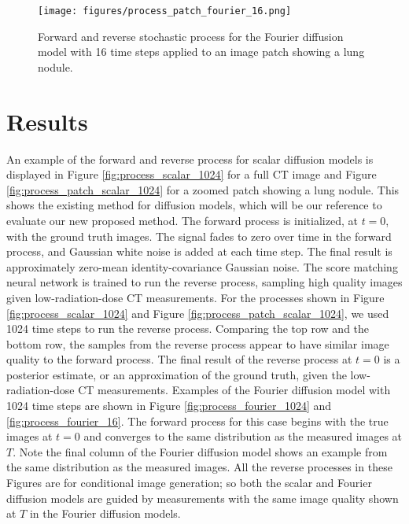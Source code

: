\documentclass[12pt,]{article}
\begin{document}
\begin{figure}[ht!]
    \centering
\texttt{[image: figures/process\_patch\_fourier\_16.png]}
    \caption{Forward and reverse stochastic process for the Fourier diffusion model with 16 time steps applied to an image patch showing a lung nodule. }
    \label{fig:process_patch_fourier_16}
\end{figure}

\vspace{-4mm}

\section{Results}

An example of the forward and reverse process for scalar diffusion models is displayed in Figure \ref{fig:process_scalar_1024} for a full CT image and Figure \ref{fig:process_patch_scalar_1024}  for a zoomed patch showing a lung nodule. This shows the existing method for diffusion models, which will be our reference to evaluate our new proposed method. The forward process is initialized, at $t=0$, with the ground truth images. The signal fades to zero over time in the forward process, and Gaussian white noise is added at each time step. The final result is approximately zero-mean identity-covariance Gaussian noise. The score matching neural network is trained to run the reverse process, sampling high quality images given low-radiation-dose  CT measurements. For the processes shown in Figure  \ref{fig:process_scalar_1024} and Figure \ref{fig:process_patch_scalar_1024}, we used 1024 time steps to run the reverse process. Comparing the top row and the bottom row, the samples from the reverse process appear to have similar image quality to the forward process. The final result of the reverse process at $t=0$ is a posterior estimate, or an approximation of the ground truth, given the low-radiation-dose CT measurements. Examples of the Fourier diffusion model with 1024 time steps are shown in Figure \ref{fig:process_fourier_1024} and \ref{fig:process_fourier_16}. The forward process for this case begins with the true images at $t=0$ and converges to the same distribution as the measured images at $T$. Note the final column of the Fourier diffusion model shows an example from the same distribution as the measured images. All the reverse processes in these Figures are for conditional image generation; so both the scalar and Fourier diffusion models are guided by measurements with the same image quality shown at $T$ in the Fourier diffusion models.
\end{document}

